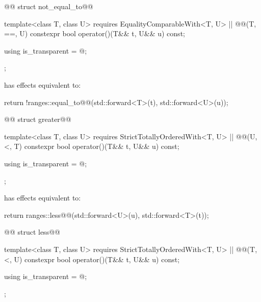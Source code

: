 \begin{itemdecl}
@@ struct not_equal_to@@ {
  template<class T, class U>
    requires EqualityComparableWith<T, U> || @@(T, ==, U)
  constexpr bool operator()(T&& t, U&& u) const;

  using is_transparent = @\unspecnc@;
};
\end{itemdecl}

\begin{itemdescr}
\pnum
{} has effects equivalent to:
\begin{codeblock}
return !ranges::equal_to@\removed{<>}@{}(std::forward<T>(t), std::forward<U>(u));
\end{codeblock}
\end{itemdescr}

\begin{itemdecl}
@@ struct greater@@ {
  template<class T, class U>
    requires StrictTotallyOrderedWith<T, U> || @@(U, <, T)
  constexpr bool operator()(T&& t, U&& u) const;

  using is_transparent = @\unspecnc@;
};
\end{itemdecl}

\begin{itemdescr}
\pnum
{} has effects equivalent to:
\begin{codeblock}
return ranges::less@\removed{<>}@{}(std::forward<U>(u), std::forward<T>(t));
\end{codeblock}
\end{itemdescr}

\begin{itemdecl}
@@ struct less@@ {
  template<class T, class U>
    requires StrictTotallyOrderedWith<T, U> || @@(T, <, U)
  constexpr bool operator()(T&& t, U&& u) const;

  using is_transparent = @\unspecnc@;
};
\end{itemdecl}

